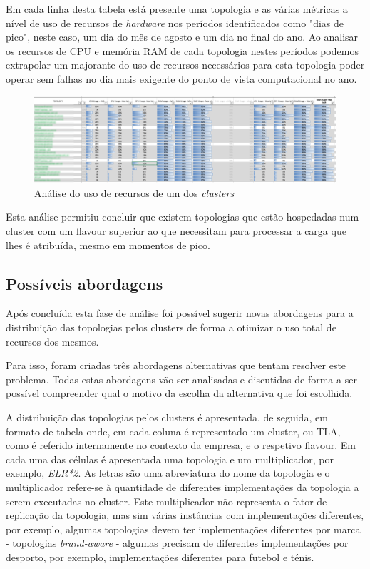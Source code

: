 Em cada linha desta tabela está presente uma topologia e as várias métricas a nível de uso de 
recursos de \textit{hardware} nos períodos identificados como "dias de pico", neste caso, um dia 
do mês de agosto e um dia no final do ano. Ao analisar os recursos de \ac{CPU} e memória RAM de 
cada topologia nestes períodos podemos extrapolar um majorante do uso de recursos necessários para
esta topologia poder operar sem falhas no dia mais exigente do ponto de vista computacional no ano.

\begin{figure}[H]
  \centerline{\includegraphics[scale=0.25]{media/content/analise/analise-ofs.png}}
  \caption{Análise do uso de recursos de um dos \textit{clusters}}
  \label{analise-ofs}
\end{figure}

Esta análise permitiu concluir que existem topologias que estão hospedadas num \gls{cluster}
com um \gls{flavour} superior ao que necessitam para processar a carga que lhes é atribuída,
mesmo em momentos de pico. 

\subsection{Possíveis abordagens}

Após concluída esta fase de análise foi possível sugerir novas abordagens para a distribuição
das topologias pelos \glspl{cluster} de forma a otimizar o uso total de recursos dos mesmos.

Para isso, foram criadas três abordagens alternativas que tentam resolver este problema. Todas estas
abordagens vão ser analisadas e discutidas de forma a ser possível compreender qual o motivo da
escolha da alternativa que foi escolhida.

A distribuição das topologias pelos \glspl{cluster} é apresentada, de seguida, em formato de 
tabela onde, em cada coluna é representado um \gls{cluster}, ou \ac{TLA}, como é referido 
internamente no contexto da empresa, e o respetivo \gls{flavour}. Em cada uma das células é
apresentada uma topologia e um multiplicador, por exemplo, \textit{ELR*2}. As letras são uma 
abreviatura do nome da topologia e o multiplicador refere-se à quantidade de diferentes
implementações da topologia a serem executadas no \gls{cluster}. Este multiplicador não representa
o fator de replicação da topologia, mas sim várias instâncias com implementações diferentes, por
exemplo, algumas topologias devem ter implementações diferentes por marca - topologias
\textit{brand-aware} - algumas precisam de diferentes implementações por desporto, por exemplo,
implementações diferentes para futebol e ténis.

